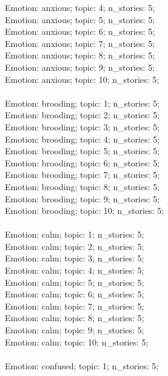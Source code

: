 \begin{anthropicbox}
    Emotion: anxious; topic: 4; n\_stories: 5;\\
    Emotion: anxious; topic: 5; n\_stories: 5;\\
    Emotion: anxious; topic: 6; n\_stories: 5;\\
    Emotion: anxious; topic: 7; n\_stories: 5;\\
    Emotion: anxious; topic: 8; n\_stories: 5;\\
    Emotion: anxious; topic: 9; n\_stories: 5;\\
    Emotion: anxious; topic: 10; n\_stories: 5;
    \\\\
    Emotion: brooding; topic: 1; n\_stories: 5;\\
    Emotion: brooding; topic: 2; n\_stories: 5;\\
    Emotion: brooding; topic: 3; n\_stories: 5;\\
    Emotion: brooding; topic: 4; n\_stories: 5;\\
    Emotion: brooding; topic: 5; n\_stories: 5;\\
    Emotion: brooding; topic: 6; n\_stories: 5;\\
    Emotion: brooding; topic: 7; n\_stories: 5;\\
    Emotion: brooding; topic: 8; n\_stories: 5;\\
    Emotion: brooding; topic: 9; n\_stories: 5;\\
    Emotion: brooding; topic: 10; n\_stories: 5;
    \\\\
    Emotion: calm; topic: 1; n\_stories: 5;\\
    Emotion: calm; topic: 2; n\_stories: 5;\\
    Emotion: calm; topic: 3; n\_stories: 5;\\
    Emotion: calm; topic: 4; n\_stories: 5;\\
    Emotion: calm; topic: 5; n\_stories: 5;\\
    Emotion: calm; topic: 6; n\_stories: 5;\\
    Emotion: calm; topic: 7; n\_stories: 5;\\
    Emotion: calm; topic: 8; n\_stories: 5;\\
    Emotion: calm; topic: 9; n\_stories: 5;\\
    Emotion: calm; topic: 10; n\_stories: 5;
    \\\\
    Emotion: confused; topic: 1; n\_stories: 5;\\

\end{anthropicbox}
